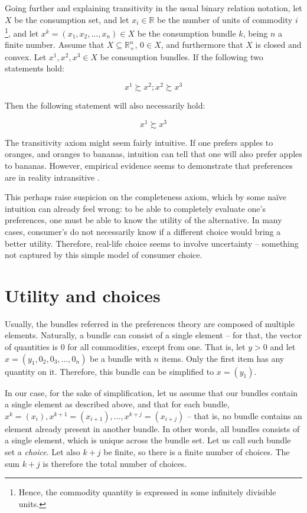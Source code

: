 \documentclass[12pt, letterpaper]{article}
\begin{document}
	Going further and explaining transitivity in the usual binary relation notation, let $X$ be the consumption set, and let $x_i \in \mathbb{R}$ be the number of units of commodity $i$\footnote{Hence, the commodity quantity is expressed in some infinitely divisible units.}, and let $x^k= (x_1, x_2, \dots, x_n) \in X$ be the consumption bundle $k$, being $n$ a finite number. Assume that $X \subseteq \mathbb{R}_+^n$, $0 \in X$, and furthermore that $X$ is closed and convex. Let $x^1, x^2, x^3 \in X$ be consumption bundles. If the following two statements hold:

	\begin{equation}
		x^1 \succsim x^2; x^2 \succsim x^3
	\end{equation}

	Then the following statement will also necessarily hold:

	\begin{equation}
		x^1 \succsim x^3
	\end{equation}

	The transitivity axiom might seem fairly intuitive. If one prefers apples to oranges, and oranges to bananas, intuition can tell that one will also prefer apples to bananas. However, empirical evidence seems to demonstrate that preferences are in reality intransitive \cite{GUADALUPELANAS2020e03459}.

	This perhaps raise suspicion on the completeness axiom, which by some naïve intuition can already feel wrong: to be able to completely evaluate one's preferences, one must be able to know the utility of the alternative. In many cases, consumer's do not necessarily know if a different choice would bring a better utility. Therefore, real-life choice seems to involve uncertainty -- something not captured by this simple model of consumer choice.

	\section{Utility and choices}
	Usually, the bundles referred in the preferences theory are composed of multiple elements. Naturally, a bundle can consist of a single element -- for that, the vector of quantities is $0$ for all commodities, except from one. That is, let  $y > 0$ and let $x = (y_1, 0_{2}, 0_{3}, \dots, 0_n)$ be a bundle with $n$ items. Only the first item has any quantity on it. Therefore, this bundle can be simplified to $x = (y_1)$.

	In our case, for the sake of simplification, let us assume that our bundles contain a single element as described above, and that for each bundle, $x^k = (x_i), x^{k+1}= (x_{i+1}), \dots , x^{k+j} = (x_{i+j})$ -- that is, no bundle contains an element already present in another bundle. In other words, all bundles consists of a single element, which is unique across the bundle set. Let us call such bundle set a \textit{choice}. Let also $k+j$ be finite, so there is a finite number of choices. The sum $k+j$ is therefore the total number of choices.
\end{document}
